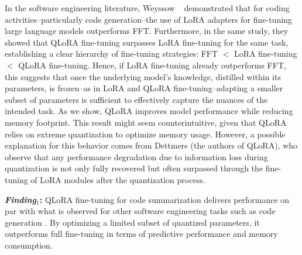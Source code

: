 In the software engineering literature, Weyssow \etal~\cite{weyssow2023exploring} demonstrated that for coding activities--particularly code generation--the use of LoRA adapters for fine-tuning large language models outperforms FFT. 
Furthermore, in the same study, they showed that QLoRA fine-tuning surpasses LoRA fine-tuning for the same task, establishing a clear hierarchy of fine-tuning strategies: FFT $<$ LoRA fine-tuning $<$ QLoRA fine-tuning. Hence, if LoRA fine-tuning already outperforms FFT, this suggests that once the underlying model’s knowledge, distilled within its parameters, is frozen--as in LoRA and QLoRA fine-tuning--adapting a smaller subset of parameters is sufficient to effectively capture the nuances of the intended task.
As we show, QLoRA improves model performance while reducing memory footprint.
This result might seem counterintuitive, given that QLoRA relies on extreme quantization to optimize memory usage. However, a possible explanation for this behavior comes from Dettmers \etal (the authors of QLoRA), who observe that any performance degradation due to information loss during quantization is not only fully recovered but often surpassed through the fine-tuning of LoRA modules after the quantization process. 

\vspace{-3pt}
\begin{boxM}
	\textbf{\emph{Finding$_{1}$}:} QLoRA fine-tuning for code summarization delivers performance on par with what is observed for other software engineering tasks such as code generation \cite{weyssow2023exploring}.
	By optimizing a limited subset of quantized parameters, it outperforms full fine-tuning in terms of predictive performance and memory consumption.
\end{boxM}



